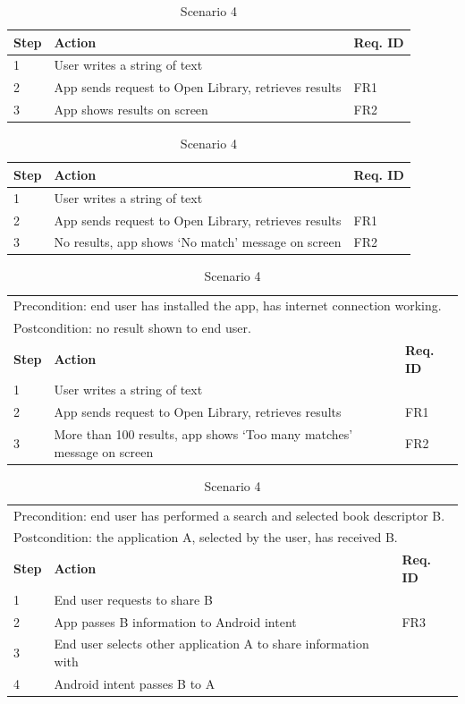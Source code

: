 \begin{table}
\small
\begin{tabularx}{\textwidth}{|l|X|l|}
\hline
\textbf{Step} & \textbf{Action} & \textbf{Req. ID} \\
\hline
1 & User writes a string of text & \\
\hline
2 & App sends request to Open Library, retrieves results & FR1 \\
\hline
3 & App shows results on screen & FR2 \\
\hline
\end{tabularx}
\caption{Scenario 1}
\label{tab:scenario1}

\begin{tabularx}{\textwidth}{|l|X|l|}
\hline
\textbf{Step} & \textbf{Action} & \textbf{Req. ID} \\
\hline
1 & User writes a string of text & \\
\hline
2 & App sends request to Open Library, retrieves results & FR1 \\
\hline
3 & No results, app shows `No match' message on screen & FR2 \\
\hline
\end{tabularx}
\caption{Scenario 2}
\label{tab:scenario2}

\begin{tabularx}{\textwidth}{|l|X|l|}
\multicolumn{3}{l}{Precondition: end user has installed the app, has internet connection working.} \\
\multicolumn{3}{l}{Postcondition: no result shown to end user.} \\
\hline
\textbf{Step} & \textbf{Action} & \textbf{Req. ID} \\
\hline
1 & User writes a string of text & \\
\hline
2 & App sends request to Open Library, retrieves results & FR1 \\
\hline
3 & More than 100 results, app shows `Too many matches' message on screen & FR2 \\
\hline
\end{tabularx}
\caption{Scenario 3}
\label{tab:scenario3}

\begin{tabularx}{\textwidth}{|l|X|l|}
\multicolumn{3}{l}{Precondition: end user has performed a search and selected book descriptor B.} \\\multicolumn{3}{l}{Postcondition: the application A, selected by the user, has received B.} \\
\hline
\textbf{Step} & \textbf{Action} & \textbf{Req. ID} \\
\hline
1 & End user requests to share B & \\
\hline
2 & App passes B information to Android intent & FR3 \\
\hline
3 & End user selects other application A to share information with & \\
\hline
4 & Android intent passes B to A & \\
\hline
\end{tabularx}
\caption{Scenario 4}
\label{tab:scenario4}
\end{table}

